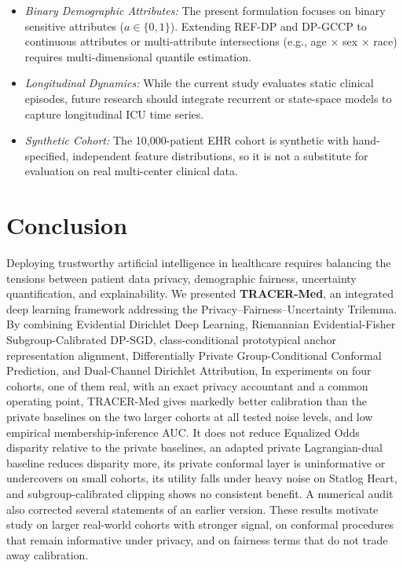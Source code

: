 \documentclass[3p,12pt]{elsarticle}
\theoremstyle{plain}
\theoremstyle{definition}
\begin{document}
\begin{itemize}
    \item \emph{Binary Demographic Attributes:} The present formulation focuses on binary sensitive attributes ($a \in \{0, 1\}$). Extending REF-DP and DP-GCCP to continuous attributes or multi-attribute intersections (e.g., age $\times$ sex $\times$ race) requires multi-dimensional quantile estimation.
    \item \emph{Longitudinal Dynamics:} While the current study evaluates static clinical episodes, future research should integrate recurrent or state-space models to capture longitudinal ICU time series.
    \item \emph{Synthetic Cohort:} The 10,000-patient EHR cohort is synthetic with hand-specified, independent feature distributions, so it is not a substitute for evaluation on real multi-center clinical data.
\end{itemize}

\section{Conclusion}
\label{sec:conclusion}
Deploying trustworthy artificial intelligence in healthcare requires balancing the tensions between patient data privacy, demographic fairness, uncertainty quantification, and explainability. We presented \textbf{TRACER-Med}, an integrated deep learning framework addressing the Privacy--Fairness--Uncertainty Trilemma. By combining Evidential Dirichlet Deep Learning, Riemannian Evidential-Fisher Subgroup-Calibrated DP-SGD, class-conditional prototypical anchor representation alignment, Differentially Private Group-Conditional Conformal Prediction, and Dual-Channel Dirichlet Attribution, In experiments on four cohorts, one of them real, with an exact privacy accountant and a common operating point, TRACER-Med gives markedly better calibration than the private baselines on the two larger cohorts at all tested noise levels, and low empirical membership-inference AUC. It does not reduce Equalized Odds disparity relative to the private baselines, an adapted private Lagrangian-dual baseline reduces disparity more, its private conformal layer is uninformative or undercovers on small cohorts, its utility falls under heavy noise on Statlog Heart, and subgroup-calibrated clipping shows no consistent benefit. A numerical audit also corrected several statements of an earlier version. These results motivate study on larger real-world cohorts with stronger signal, on conformal procedures that remain informative under privacy, and on fairness terms that do not trade away calibration.
\end{document}
